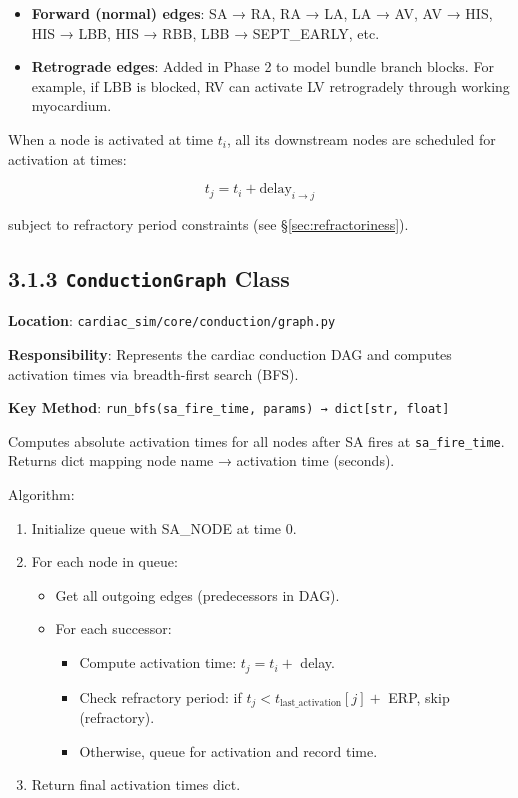 \documentclass[12pt,oneside,a4paper]{book}
\newcommand{\code}[1]{\texttt{#1}}
\newcommand{\file}[1]{\texttt{#1}}
\newcommand{\class}[1]{\textbf{\code{#1}}}
\begin{document}
\begin{itemize}
  \item \textbf{Forward (normal) edges}: SA → RA, RA → LA, LA → AV, AV → HIS, HIS → LBB, HIS → RBB, LBB → SEPT\_EARLY, etc.
  \item \textbf{Retrograde edges}: Added in Phase 2 to model bundle branch blocks. For example, if LBB is blocked, RV can activate LV retrogradely through working myocardium.
\end{itemize}

When a node is activated at time $t_i$, all its downstream nodes are scheduled for activation at times:

$$t_j = t_i + \text{delay}_{i \to j}$$

subject to refractory period constraints (see \S\ref{sec:refractoriness}).

\subsection{3.1.3 \class{ConductionGraph} Class}

\textbf{Location}: \file{cardiac\_sim/core/conduction/graph.py}

\textbf{Responsibility}: Represents the cardiac conduction DAG and computes activation times via breadth-first search (BFS).

\textbf{Key Method}: \code{run\_bfs(sa\_fire\_time, params) → dict[str, float]}

Computes absolute activation times for all nodes after SA fires at \code{sa\_fire\_time}. Returns dict mapping node name → activation time (seconds).

Algorithm:

\begin{enumerate}
  \item Initialize queue with SA\_NODE at time 0.
  \item For each node in queue:
    \begin{itemize}
      \item Get all outgoing edges (predecessors in DAG).
      \item For each successor:
        \begin{itemize}
          \item Compute activation time: $t_j = t_i +$ delay.
          \item Check refractory period: if $t_j < t_{\text{last\_activation}}[j] +$ ERP, skip (refractory).
          \item Otherwise, queue for activation and record time.
        \end{itemize}
    \end{itemize}
  \item Return final activation times dict.
\end{enumerate}
\end{document}
